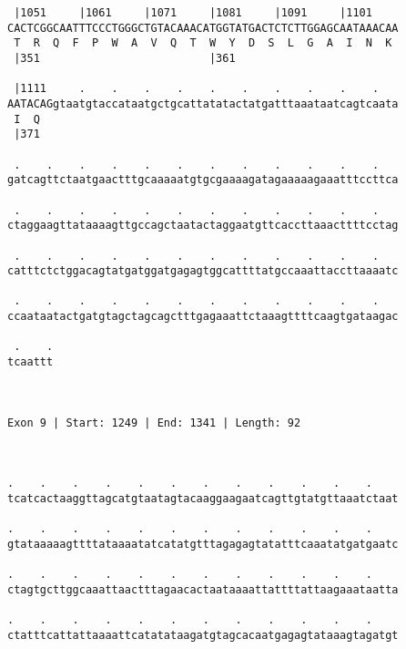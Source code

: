 \documentclass{article}
\begin{document}
\begin{Verbatim}
 |1051     |1061     |1071     |1081     |1091     |1101    
CACTCGGCAATTTCCCTGGGCTGTACAAACATGGTATGACTCTCTTGGAGCAATAAACAA
 T  R  Q  F  P  W  A  V  Q  T  W  Y  D  S  L  G  A  I  N  K 
 |351                          |361                         
  
 |1111     .    .    .    .    .    .    .    .    .    .   
AATACAGgtaatgtaccataatgctgcattatatactatgatttaaataatcagtcaata
 I  Q                                                       
 |371                                                       
  
 .    .    .    .    .    .    .    .    .    .    .    .   
gatcagttctaatgaactttgcaaaaatgtgcgaaaagatagaaaaagaaatttccttca
                                                            
 .    .    .    .    .    .    .    .    .    .    .    .   
ctaggaagttataaaagttgccagctaatactaggaatgttcaccttaaacttttcctag
                                                            
 .    .    .    .    .    .    .    .    .    .    .    .   
catttctctggacagtatgatggatgagagtggcattttatgccaaattaccttaaaatc
                                                            
 .    .    .    .    .    .    .    .    .    .    .    .   
ccaataatactgatgtagctagcagctttgagaaattctaaagttttcaagtgataagac
                                                            
 .    .
tcaattt
       
       
 
Exon 9 | Start: 1249 | End: 1341 | Length: 92



.    .    .    .    .    .    .    .    .    .    .    .    
tcatcactaaggttagcatgtaatagtacaaggaagaatcagttgtatgttaaatctaat
                                                            
.    .    .    .    .    .    .    .    .    .    .    .    
gtataaaaagttttataaaatatcatatgtttagagagtatatttcaaatatgatgaatc
                                                            
.    .    .    .    .    .    .    .    .    .    .    .    
ctagtgcttggcaaattaactttagaacactaataaaattattttattaagaaataatta
                                                            
.    .    .    .    .    .    .    .    .    .    .    .    
ctatttcattattaaaattcatatataagatgtagcacaatgagagtataaagtagatgt
                                                            

\end{Verbatim}
\end{document}

